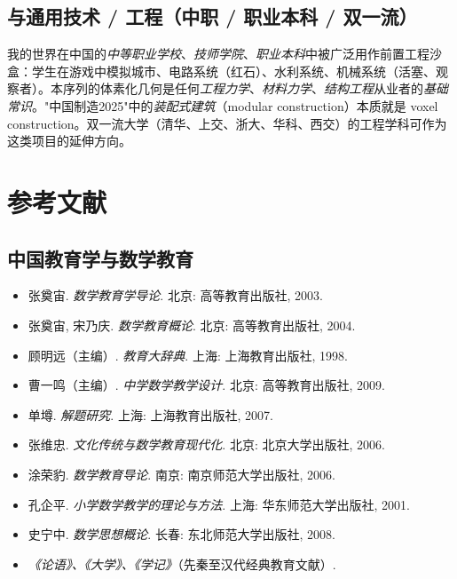 \documentclass[12pt,a4paper]{scrartcl}
\begin{document}
\subsection{与通用技术 / 工程（中职 / 职业本科 / 双一流）}
我的世界在中国的\emph{中等职业学校}、\emph{技师学院}、\emph{职业本科}中被广泛用作前置工程沙盒：学生在游戏中模拟城市、电路系统（红石）、水利系统、机械系统（活塞、观察者）。本序列的体素化几何是任何\emph{工程力学}、\emph{材料力学}、\emph{结构工程}从业者的\emph{基础常识}。"中国制造2025"中的\emph{装配式建筑}（modular construction）本质就是 voxel construction。双一流大学（清华、上交、浙大、华科、西交）的工程学科可作为这类项目的延伸方向。

\section{参考文献}\label{sec:referencias}

\subsection{中国教育学与数学教育}
\begin{itemize}[leftmargin=1.3em,itemsep=0.15em,topsep=0.3em]
  \item 张奠宙. \emph{数学教育学导论}. 北京: 高等教育出版社, 2003.
  \item 张奠宙, 宋乃庆. \emph{数学教育概论}. 北京: 高等教育出版社, 2004.
  \item 顾明远（主编）. \emph{教育大辞典}. 上海: 上海教育出版社, 1998.
  \item 曹一鸣（主编）. \emph{中学数学教学设计}. 北京: 高等教育出版社, 2009.
  \item 单墫. \emph{解题研究}. 上海: 上海教育出版社, 2007.
  \item 张维忠. \emph{文化传统与数学教育现代化}. 北京: 北京大学出版社, 2006.
  \item 涂荣豹. \emph{数学教育导论}. 南京: 南京师范大学出版社, 2006.
  \item 孔企平. \emph{小学数学教学的理论与方法}. 上海: 华东师范大学出版社, 2001.
  \item 史宁中. \emph{数学思想概论}. 长春: 东北师范大学出版社, 2008.
  \item \emph{《论语》、《大学》、《学记》}（先秦至汉代经典教育文献）.
\end{itemize}
\end{document}
